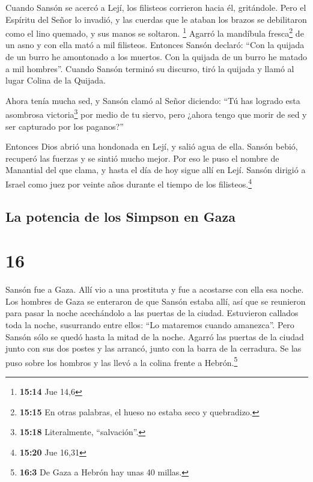  Cuando Sansón se acercó a Lejí, los filisteos corrieron
hacia él, gritándole. Pero el Espíritu del Señor lo invadió, y las
cuerdas que le ataban los brazos se debilitaron como el lino quemado, y
sus manos se soltaron. \footnote{\textbf{15:14} Jue 14,6}
 Agarró la mandíbula fresca\footnote{\textbf{15:15} En
  otras palabras, el hueso no estaba seco y quebradizo.} de un asno y
con ella mató a mil filisteos.  Entonces Sansón declaró:
``Con la quijada de un burro he amontonado a los muertos. Con la quijada
de un burro he matado a mil hombres''.  Cuando Sansón
terminó su discurso, tiró la quijada y llamó al lugar Colina de la
Quijada.

 Ahora tenía mucha sed, y Sansón clamó al Señor diciendo:
``Tú has logrado esta asombrosa victoria\footnote{\textbf{15:18}
  Literalmente, ``salvación''.} por medio de tu siervo, pero ¿ahora
tengo que morir de sed y ser capturado por los paganos?''

 Entonces Dios abrió una hondonada en Lejí, y salió agua
de ella. Sansón bebió, recuperó las fuerzas y se sintió mucho mejor. Por
eso le puso el nombre de Manantial del que clama, y hasta el día de hoy
sigue allí en Lejí.  Sansón dirigió a Israel como juez
por veinte años durante el tiempo de los filisteos.\footnote{\textbf{15:20}
  Jue 16,31}

\hypertarget{la-potencia-de-los-simpson-en-gaza}{%
\subsection{La potencia de los Simpson en
Gaza}\label{la-potencia-de-los-simpson-en-gaza}}

\hypertarget{section-15}{%
\section{16}\label{section-15}}

 Sansón fue a Gaza. Allí vio a una prostituta y fue a
acostarse con ella esa noche.  Los hombres de Gaza se
enteraron de que Sansón estaba allí, así que se reunieron para pasar la
noche acechándolo a las puertas de la ciudad. Estuvieron callados toda
la noche, susurrando entre ellos: ``Lo mataremos cuando amanezca''.
 Pero Sansón sólo se quedó hasta la mitad de la noche.
Agarró las puertas de la ciudad junto con sus dos postes y las arrancó,
junto con la barra de la cerradura. Se las puso sobre los hombros y las
llevó a la colina frente a Hebrón.\footnote{\textbf{16:3} De Gaza a
  Hebrón hay unas 40 millas.}

